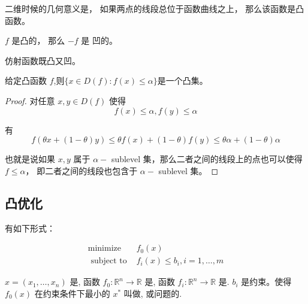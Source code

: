 二维时候的几何意义是， 如果两点的线段总位于函数曲线之上， 那么该函数是凸函数。

\begin{theorem}
    $ f $ 是凸的， 那么 $ -f $ 是 凹的。
\end{theorem}

\begin{theorem}
    
仿射函数既凸又凹。
\end{theorem}


\begin{theorem}
    给定凸函数 $ f$,则$\{x \in D(f): f(x) \leqslant \alpha\} $是一个凸集。
\end{theorem}

\begin{proof}
    对任意 $ x, y \in D(f) $ 使得 \begin{equation} f(x) \leqslant \alpha, f(y) \leqslant \alpha \end{equation}
    
    有 \begin{equation} f(\theta x+(1-\theta) y) \leqslant \theta f(x)+(1-\theta) f(y) \leqslant \theta \alpha+(1-\theta) \alpha \end{equation}
    
    也就是说如果 $ x, y $ 属于 $ \alpha- $ sublevel 集，那么二者之间的线段上的点也可以使得 $ f \leqslant \alpha ， $ 即二者之间的线段也包含于 $ \alpha- $ sublevel 集。
\end{proof}

\subsection{凸优化}

\begin{definition}[优化问题]
    有如下形式：

    \begin{equation}
\begin{array}{ll}
\operatorname{minimize} & f_{0}(x) \\
\text { subject to } & f_{i}(x) \leqslant b_{i}, i=1, \ldots, m
\end{array}
\end{equation}

$ x=\left(x_{1}, \ldots, x_{n}\right) $ 是, 函数 $ f_{0}: \mathbb{R}^{n} \rightarrow \mathbb{R} $ 是, 函数 $ f_{i}: \mathbb{R}^{n} \rightarrow \mathbb{R} $ 是. $ b_{i} $ 是约束。使得 $ f_{0}(x) $ 在约束条件下最小的 $ x^{*} $ 叫做, 或问题的.
\end{definition}

